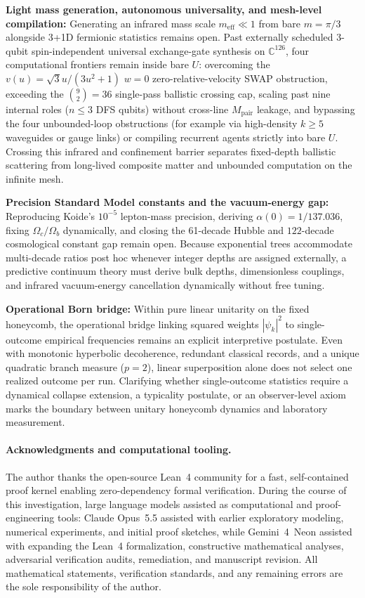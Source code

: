 \textbf{Light mass generation, autonomous universality, and mesh-level compilation:} Generating an infrared mass scale
$m_{\mathrm{eff}} \ll 1$ from bare $m = \pi/3$ alongside 3+1D fermionic statistics remains open. Past externally
scheduled 3-qubit spin-independent universal exchange-gate synthesis on $\mathbb{C}^{126}$, four computational
frontiers remain inside bare $U$: overcoming the $v(u) = \sqrt{3}u/(3u^2+1)$ $w = 0$ zero-relative-velocity SWAP
obstruction, exceeding the $\binom{9}{2} = 36$ single-pass ballistic crossing cap, scaling past nine internal roles
($n \le 3$ DFS qubits) without cross-line $M_{\mathrm{pair}}$ leakage, and bypassing the four unbounded-loop
obstructions \cite{pollard2026railway} (for example via high-density $k \ge 5$ waveguides or gauge links) or compiling
recurrent agents strictly into bare $U$. Crossing this infrared and confinement barrier separates fixed-depth ballistic
scattering from long-lived composite matter and unbounded computation on the infinite mesh.

\textbf{Precision Standard Model constants and the vacuum-energy gap:} Reproducing Koide's $10^{-5}$ lepton-mass
precision, deriving $\alpha(0) = 1/137.036$, fixing $\Omega_c / \Omega_b$ dynamically, and closing the 61-decade Hubble
and $122$-decade cosmological constant gap \cite{weinberg1989} remain open. Because exponential trees accommodate
multi-decade ratios post hoc whenever integer depths are assigned externally, a predictive continuum theory must derive
bulk depths, dimensionless couplings, and infrared vacuum-energy cancellation dynamically without free tuning.

\textbf{Operational Born bridge:} Within pure linear unitarity on the fixed honeycomb, the operational bridge linking
squared weights $|\psi_k|^2$ to single-outcome empirical frequencies remains an explicit interpretive postulate. Even
with monotonic hyperbolic decoherence, redundant classical records, and a unique quadratic branch measure ($p = 2$),
linear superposition alone does not select one realized outcome per run. Clarifying whether single-outcome statistics
require a dynamical collapse extension, a typicality postulate, or an observer-level axiom marks the boundary between
unitary honeycomb dynamics and laboratory measurement.

\paragraph{Acknowledgments and computational tooling.}
The author thanks the open-source Lean~4 community for a fast, self-contained proof kernel enabling zero-dependency
formal verification. During the course of this investigation, large language models assisted as computational and
proof-engineering tools: Claude Opus~5.5 assisted with earlier exploratory modeling, numerical experiments, and initial
proof sketches, while Gemini~4~Neon assisted with expanding the Lean~4 formalization, constructive mathematical
analyses, adversarial verification audits, remediation, and manuscript revision. All mathematical statements,
verification standards, and any remaining errors are the sole responsibility of the author.
